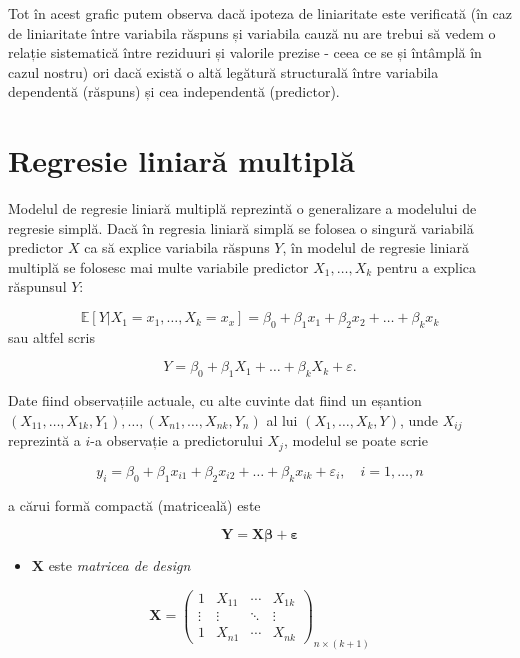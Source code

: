 \documentclass[]{article}
\providecommand{\tightlist}{%
  \setlength{\itemsep}{0pt}\setlength{\parskip}{0pt}}
\begin{document}
Tot în acest grafic putem observa dacă ipoteza de liniaritate este
verificată (în caz de liniaritate între variabila răspuns și variabila
cauză nu are trebui să vedem o relație sistematică între reziduuri și
valorile prezise - ceea ce se și întâmplă în cazul nostru) ori dacă
există o altă legătură structurală între variabila dependentă (răspuns)
și cea independentă (predictor).

\section{Regresie liniară multiplă}\label{regresie-liniara-multipla}

Modelul de regresie liniară multiplă reprezintă o generalizare a
modelului de regresie simplă. Dacă în regresia liniară simplă se folosea
o singură variabilă predictor \(X\) ca să explice variabila răspuns
\(Y\), în modelul de regresie liniară multiplă se folosesc mai multe
variabile predictor \(X_1,\ldots,X_k\) pentru a explica răspunsul \(Y\):

\[
\mathbb{E}[Y|X_1 = x_1, \ldots, X_k=x_x]=\beta_0+\beta_1x_1+\beta_2x_2+\ldots+\beta_kx_k
\] sau altfel scris

\[
Y = \beta_0 + \beta_1 X_1 + \ldots + \beta_k X_k + \varepsilon.
\]

Date fiind observațiile actuale, cu alte cuvinte dat fiind un eșantion
\((X_{11},\ldots,X_{1k},Y_1),\ldots,(X_{n1},\ldots,X_{nk},Y_n)\) al lui
\((X_1,\ldots,X_k,Y)\), unde \(X_{ij}\) reprezintă a \(i\)-a observație
a predictorului \(X_j\), modelul se poate scrie

\[
y_i = \beta_0+\beta_1x_{i1}+\beta_2x_{i2}+\ldots+\beta_kx_{ik}+\varepsilon_i, \quad i = 1,\ldots,n
\]

a cărui formă compactă (matriceală) este

\[
\mathbf{Y}=\mathbf{X}\boldsymbol\beta+\boldsymbol\varepsilon
\]

\begin{itemize}
\tightlist
\item
  \(\mathbf{X}\) este \emph{matricea de design}
\end{itemize}

\[
\mathbf{X}=\begin{pmatrix}
1 & X_{11} & \cdots & X_{1k}\\
\vdots & \vdots & \ddots & \vdots\\
1 & X_{n1} & \cdots & X_{nk}
\end{pmatrix}_{n\times(k+1)}
\]
\end{document}
